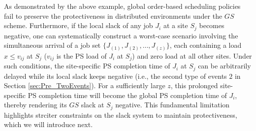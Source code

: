 As demonstrated by the above example, global order-based scheduling policies fail to preserve the protectiveness in distributed environments under the $GS$ scheme. Furthermore, if the local slack of any job $J_i$ at a site $S_j$ becomes negative, one can systematically construct a worst-case scenario involving the simultaneous arrival of a job set $\{J_{(1)}, J_{(2)}, \dots, J_{(z)}\}$, each containing a load $x \le v_{ij}$ at $S_j$ ($v_{ij}$ is the PS load of $J_i$ at $S_j$) and zero load at all other sites. Under such conditions, the site-specific PS completion time of $J_i$ at $S_j$ can be arbitrarily delayed while its local slack keeps negative (i.e., the second type of events $2$ in Section \ref{sec:Pre_TwoEvents}). For a sufficiently large $z$, this prolonged site-specific PS completion time will become the global PS completion time of $J_i$, thereby rendering its $GS$ slack at $S_j$ negative. This fundamental limitation highlights strciter constraints on the slack system to maintain protectiveness, which we will introduce next.

